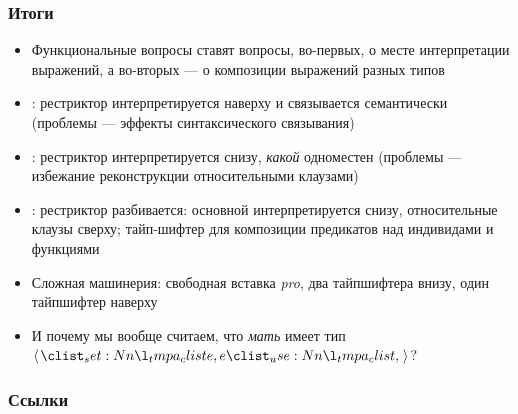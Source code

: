 \documentclass[
    9pt,
]{beamer}
\begin{document}
\begin{frame}
    \frametitle{Итоги}

    \begin{itemize}
        \item Функциональные вопросы ставят вопросы, во-первых, о месте интерпретации выражений, а во-вторых — о композиции выражений разных типов
        \item \textcite{engdahl1986constituentquestionssyntax}: рестриктор интерпретируется наверху и связывается семантически (проблемы — эффекты синтаксического связывания)
        \item \textcite{heim2018functionalreadingstypeshifted}: рестриктор интерпретируется снизу, \textit{какой} одноместен (проблемы — избежание реконструкции относительными клаузами)
        \item \textcite{haldar2024middlegroundengdahl}: рестриктор разбивается: основной интерпретируется снизу, относительные клаузы сверху; тайп-шифтер для композиции предикатов над индивидами и функциями
        \item Сложная машинерия: свободная вставка \textit{pro}, два тайпшифтера внизу, один тайпшифтер наверху
        \item И почему мы вообще считаем, что \textit{мать} имеет тип $\opair{e, e}$?
    \end{itemize}

\end{frame}

\begin{frame}
    \frametitle{Ссылки}

    \printbibliography

\end{frame}
\end{document}
